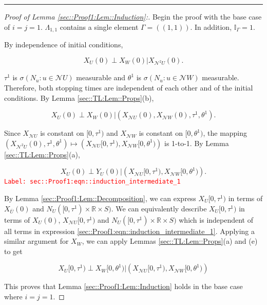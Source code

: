 \documentclass[12pt]{article}
\newcommand{\mb}{\mathbb}
\newcommand{\mc}{\mathcal}
\newcommand{\ov}{\overline}
\newcommand{\tr}{\textcolor{red}}
\newcommand{\labe}[1]{\tr{\texttt{Label: #1}}}
\newcommand{\lin}{\rule{\linewidth}{0.4 pt}}
\newcommand{\neigh}{\mc{N}}					%
\newcommand{\dneigh}{\mc{N}^2}				%
\newcommand{\vv}{u}								%
\renewcommand{\U}{U}							%
\newcommand{\UU}{W}								%
\newcommand{\cl}{\ov}							%
\renewcommand{\S}{S}							%
\newcommand{\poiss}[1]{N_{#1}}						%
\newcommand{\rt}[1]{\tau^{#1}}						%
\newcommand{\rtt}[1]{\theta^{#1}}					%
\newcommand{\itt}{i}								%
\newcommand{\ittt}{j}								%
\newcommand{\rxvt}[2]{X_{#1}{(#2)}}					%
\newcommand{\rxvtt}[2]{Y_{#1}{(#2)}}				%
\newcommand{\rxvts}[2]{X_{#1}{#2}}					%
\newcommand{\apath}{\Gamma}						%
\newcommand{\pathset}[2]{\Lambda_{#1,#2}}			%
\begin{document}
\lin

\begin{proof}[Proof of Lemma \ref{sec::Proof1:Lem::Induction}:]
Begin the proof with the base case of \(\itt=\ittt =1\). \(\pathset{1}{1}\) contains a single element \(\apath = ((1,1))\). In addition, \(\mb{I}_{\apath} = 1\).

By independence of initial conditions,

\[\rxvt{\U}{0}\perp \rxvt{\UU}{0}|\rxvt{\dneigh{\U}}{0}.\]

\(\rt{1}\) is \(\sigma\left(\poiss{\vv}:\vv\in \neigh{\U}\right)\) measurable and \(\rtt{1}\) is \(\sigma\left(\poiss{\vv}:\vv\in \neigh{\UU}\right)\) measurable. Therefore, both stopping times are independent of each other and of the initial conditions. By Lemma \ref{sec::TL:Lem::Props}(b), 

\[\rxvt{\U}{0}\perp \rxvt{\UU}{0}|\left(\rxvt{\neigh{\U}}{0},\rxvt{\neigh{\UU}}{0},\rt{1},\rtt{1}\right).\]

Since \(\rxvts{\neigh{\U}}{}\) is constant on \([0,\rt{1})\) and \(\rxvts{\neigh{\UU}}{}\) is constant on \([0,\rtt{1})\), the mapping \((\rxvt{\dneigh{\U}}{0},\rt{1},\rtt{1}) \mapsto (\rxvts{\neigh{\U}}{[0,\rt{1})},\rxvts{\neigh{\UU}}{[0,\rtt{1})})\) is 1-to-1. By Lemma \ref{sec::TL:Lem::Props}(a),

\begin{equation}
\rxvt{\U}{0}\perp \rxvtt{\U}{0}|\left(\rxvts{\neigh{\U}}{[0,\rt{1})},\rxvts{\neigh{\UU}}{[0,\rtt{1})}\right).
\label{sec::Proof1:eqn::induction_intermediate_1}
\end{equation}
\labe{sec::Proof1:eqn::induction\_intermediate\_1}

By Lemma \ref{sec::Proof1:Lem::Decomposition}, we can express \(\rxvts{\U}{[0,\rt{1})}\) in terms of \(\rxvt{\cl{\U}}{0}\) and \(\poiss{\U}([0,\rt{1})\times\mb{R}\times\S)\). We can equivalently describe \(\rxvts{\U}{[0,\rt{1})}\) in terms of \(\rxvt{\U}{0}\), \(\rxvts{\neigh{\U}}{[0,\rt{1})}\) and \(\poiss{\U}([0,\rt{1})\times \mb{R}\times \S)\) which is independent of all terms in expression \eqref{sec::Proof1:eqn::induction_intermediate_1}. Applying a similar argument for \(\rxvts{\UU}{}\), we can apply Lemmas \ref{sec::TL:Lem::Props}(a) and (e) to get

\[\rxvts{\U}{[0,\rt{1})}\perp \rxvts{\UU}{[0,\rtt{1})}|\left(\rxvts{\neigh{\U}}{[0,\rt{1})},\rxvts{\neigh{\UU}}{[0,\rtt{1})}\right)\]

This proves that Lemma \ref{sec::Proof1:Lem::Induction} holds in the base case where \(\itt = \ittt = 1\).


\end{proof}
\end{document}
